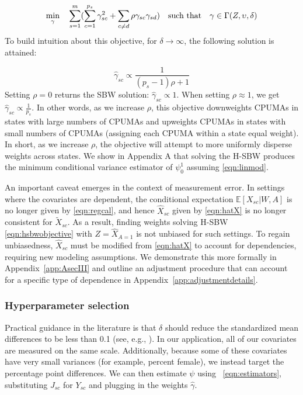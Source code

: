 \documentclass[aoas]{imsart}
\theoremstyle{plain}
\theoremstyle{remark}
\begin{document}
\begin{equation}\label{eqn:hsbwobjective}
\min_{\gamma} \quad \sum_{s=1}^{m}(\sum_{c = 1}^{p_s}\gamma_{sc}^2 + \sum_{c \ne d}\rho \gamma_{sc}\gamma_{sd}) \quad \text{such that} \quad \gamma \in \Gamma(Z, \upsilon, \delta)\\
\end{equation}
To build intuition about this objective, for $\delta \to \infty$, the following solution is attained:

\begin{equation}\label{eqn:sbwsol}
\hat{\gamma}_{sc} \propto \frac{1}{(p_s - 1)\rho + 1}
\end{equation}
Setting $\rho = 0$ returns the SBW solution: $\hat{\gamma}_{sc} \propto 1$. When setting $\rho \approx 1$, we get $\hat{\gamma}_{sc} \propto \frac{1}{p_s}$. In other words, as we increase $\rho$, this objective downweights CPUMAs in states with large numbers of CPUMAs and upweights CPUMAs in states with small numbers of CPUMAs (assigning each CPUMA within a state equal weight). In short, as we increase $\rho$, the objective will attempt to more uniformly disperse weights across states. We show in Appendix A that solving the H-SBW produces the minimum conditional variance estimator of $\psi_0^1$ assuming \eqref{eqn:linmod}.

An important caveat emerges in the context of measurement error. In settings where the covariates are dependent, the conditional expectation $\mathbb{E}[X_{sc}|W,A]$ is no longer given by \eqref{eqn:regcal}, and hence $\hat{X}_{sc}$ given by \eqref{eqn:hatX} is no longer consistent for $\tilde{X}_{sc}$. As a result, finding weights solving H-SBW \eqref{eqn:hsbwobjective} with $Z = \hat{X}_{A=1}$ is not unbiased for such settings. To regain unbiasedness, $\hat{X}_{sc}$ must be modified from \eqref{eqn:hatX} to account for dependencies, requiring new modeling assumptions. We demonstrate this more formally in Appendix~\ref{app:AsecIII} and outline an adjustment procedure that can account for a specific type of dependence in Appendix~\ref{app:adjustmentdetails}.

\subsubsection{Hyperparameter selection} \label{ssec:delta}

Practical guidance in the literature is that $\delta$ should reduce the standardized mean differences to be less than 0.1 (see, e.g., \cite{zhang2019balance}). In our application, all of our covariates are measured on the same scale. Additionally, because some of these covariates have very small variances (for example, percent female), we instead target the percentage point differences. We can then estimate $\psi$ using ~\eqref{eqn:estimators}, substituting $J_{sc}$ for $Y_{sc}$ and plugging in the weights $\hat{\gamma}$.
\end{document}
